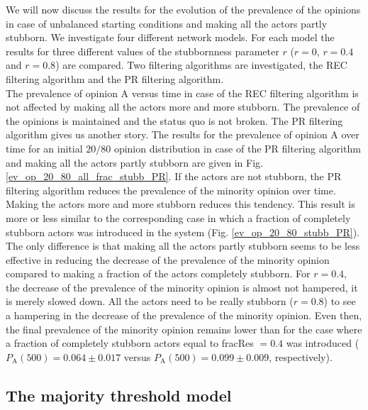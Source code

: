 \documentclass[11 pt , letterpaper , twoside , openright]{book}
\begin{document}
\noindent
We will now discuss the results for the evolution of the prevalence of the opinions in case of unbalanced starting conditions and making all the actors partly stubborn. We investigate four different network models. For each model the results for three different values of the stubbornness parameter $r$ ($r=0$, $r=0.4$ and $r=0.8$) are compared. Two filtering algorithms are investigated, the REC filtering algorithm and the PR filtering algorithm.\\
\newline
The prevalence of opinion A versus time in case of the REC filtering algorithm is not affected by making all the actors more and more stubborn. The prevalence of the opinions is maintained and the status quo is not broken. The PR filtering algorithm gives us another story. The results for the prevalence of opinion A over time for an initial $20/80$ opinion distribution in case of the PR filtering algorithm and making all the actors partly stubborn are given in Fig. \ref{ev_op_20_80_all_frac_stubb_PR}. If the actors are not stubborn, the PR filtering algorithm reduces the prevalence of the minority opinion over time. Making the actors more and more stubborn reduces this tendency. This result is more or less similar to the corresponding case in which a fraction of completely stubborn actors was introduced in the system (Fig. \ref{ev_op_20_80_stubb_PR}). The only difference is that making all the actors partly stubborn seems to be less effective in reducing the decrease of the prevalence of the minority opinion compared to making a fraction of the actors completely stubborn. For $r=0.4$, the decrease of the prevalence of the minority opinion is almost not hampered, it is merely slowed down. All the actors need to be really stubborn ($r=0.8$) to see a hampering in the decrease of the prevalence of the minority opinion. Even then, the final prevalence of the minority opinion remains lower than for the case where a fraction of completely stubborn actors equal to fracRes $=0.4$ was introduced ($P_\text{A}(500) = 0.064 \pm 0.017$ versus $P_\text{A}(500) = 0.099 \pm 0.009$, respectively).

\subsection{The majority threshold model}
\label{majThres}
\end{document}
